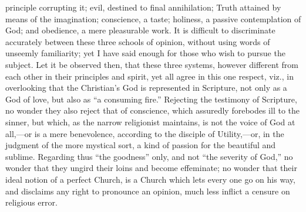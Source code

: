principle corrupting it; evil, destined to final annihilation; Truth
attained by means of the imagination; conscience, a taste; holiness, a
passive contemplation of God; and obedience, a mere pleasurable work. It
is difficult to discriminate accurately between these three schools of
opinion, without using words of unseemly familiarity; yet I have said
enough for those who wish to pursue the subject. Let it be observed
then, that these three systems, however different from each other in
their principles and spirit, yet all agree in this one respect, viz., in
overlooking that the Christian's God is represented in Scripture, not
only as a God of love, but also as ``a consuming fire.''
Rejecting the testimony of Scripture, no wonder they also reject that of
conscience, which assuredly forebodes ill to the sinner, but which, as
the narrow religionist maintains, is not the voice of God at all,—or
is a mere benevolence, according to the disciple of Utility,—or, in
the judgment of the more mystical sort, a kind of passion for the
beautiful and sublime. Regarding thus ``the goodness'' only, and
not ``the severity of God,'' no wonder that they ungird their
loins and become effeminate; no wonder that their ideal notion of a
perfect Church, is a Church which lets every one go on his way, and
disclaims any right to pronounce an opinion, much less inflict a censure
on religious error.

